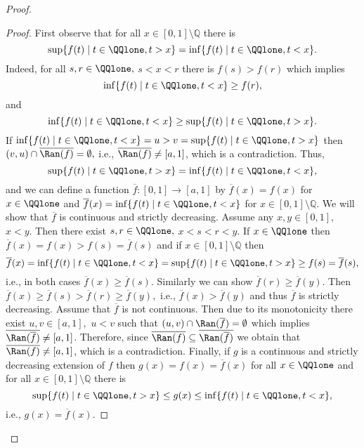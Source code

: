 \begin{proof}
\begin{proof}
		First observe that for all $x\in [0,1]\setminus \mathbb{Q}$ there is $$\sup \{f(t)\mid t\in \QQlone, t>x\} = \inf \{f(t)\mid t\in \QQlone, t<x\}.$$
		Indeed, for all $s,r\in \QQlone,$ $s<x<r$ there is $f(s)>f(r)$ which implies 
		$$\inf \{f(t)\mid t\in \QQlone, t<x\}\geq f(r),$$
		and 
		$$\inf \{f(t)\mid t\in \QQlone, t<x\}\geq \sup \{f(t)\mid t\in \QQlone, t>x\}.$$
		If $\inf \{f(t)\mid t\in \QQlone, t<x\} = u > v=\sup \{f(t)\mid t\in \QQlone, t>x\}$ then $(v,u) \cap \overline{\Ran (f)} = \emptyset,$ i.e., $\overline{\Ran (f)} \neq [a,1]$,
		which is a contradiction. Thus,
		$$\sup \{f(t)\mid t\in \QQlone, t>x\} = \inf \{f(t)\mid t\in \QQlone, t<x\},$$
		and we can define a function $\overline{f}: [0,1] \to [a,1]$ by $\overline{f}(x)=f(x)$ for $x\in \QQlone$ and $\overline{f}(x)=\inf \{f(t)\mid t\in \QQlone, t<x\}$ for $x\in [0,1]\setminus \mathbb{Q}.$
		We will show that  $\overline{f}$ is continuous and strictly decreasing. Assume any $x,y\in [0,1],$ $x<y.$
		Then there exist $s,r\in \QQlone,$ $x<s<r<y.$ If $x\in \QQlone$ then $\overline{f}(x)= f(x)>f(s)=\overline{f}(s)$
		and if $x\in [0,1]\setminus \mathbb{Q}$ then 
		$$\overline{f}(x)=\inf \{f(t)\mid t\in \QQlone, t<x\}=\sup \{f(t)\mid t\in \QQlone, t>x\}\geq f(s)=\overline{f}(s),$$
		i.e., in both cases $\overline{f}(x)\geq \overline{f}(s).$ Similarly we can show $\overline{f}(r)\geq \overline{f}(y).$
		Then $\overline{f}(x)\geq \overline{f}(s)>\overline{f}(r)\geq \overline{f}(y),$ i.e., $\overline{f}(x)> \overline{f}(y)$ and thus $\overline{f}$ is strictly decreasing.
		Assume that $\overline{f}$ is not continuous. Then due to its monotonicity there exist $u,v\in [a,1],$ $u<v$ such that $(u,v) \cap \Ran (\overline{f}) = \emptyset$
		which implies $\overline{\Ran (\overline{f})} \neq [a,1]$. Therefore, since $\overline{\Ran(f)} \subseteq \overline{\Ran(\overline{f})}$ we obtain that $\overline{\Ran (f)} \neq [a,1]$, which is a contradiction.
		Finally, if $g$ is a continuous and strictly decreasing extension of $f$ then $g(x)=f(x)=\overline{f}(x)$ for all $x\in \QQlone$
		and for all $x\in [0,1]\setminus \mathbb{Q}$ there is 
		$$\sup \{f(t)\mid t\in \QQlone, t>x\} \leq g(x) \leq \inf \{f(t)\mid t\in \QQlone, t<x\},$$
		i.e., $g(x)=\overline{f}(x).$
	\end{proof}
	

\end{proof}
